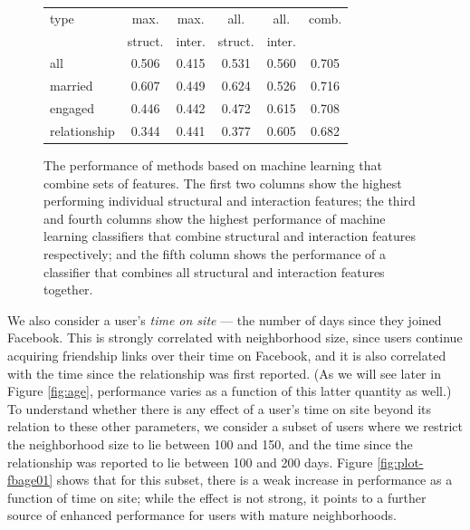 \documentclass{sigchi}
\def\rs{\vspace*{-0.10in}}
\begin{document}
\begin{figure}
\begin{center}
\begin{tabular}{|l|c|c|c|c|c|}
\hline
type & max. & max. & all. & all. & comb. \\
     & struct. & inter. & struct. & inter. & 
\\\hline
all & 0.506 & 0.415 & 0.531 & 0.560 & 0.705
\\\hline
married & 0.607 & 0.449 & 0.624 & 0.526 & 0.716
\\\hline
engaged & 0.446 & 0.442 & 0.472 & 0.615 & 0.708
\\\hline
relationship & 0.344 & 0.441 & 0.377 & 0.605 & 0.682
\\\hline
\end{tabular}
\caption{
\label{table:ml_perf}
The performance of methods based on machine learning that combine
sets of features.
The first two columns show the highest performing individual structural
and interaction features; the third and fourth columns show the
highest performance of machine learning classifiers that combine
structural and interaction features respectively; and the fifth
column shows the performance of a classifier that combines all
structural and interaction features together.
\rs 
}
\end{center}
\vspace*{-0.12in}
\end{figure}

We also consider a user's {\em time on site} --- the number of days
since they joined Facebook.
This is strongly correlated with neighborhood size, since users
continue acquiring friendship links over their time on Facebook,
and it is also correlated with the time since the relationship 
was first reported. (As we will see later in 
Figure \ref{fig:age}, performance varies as a function of this
latter quantity as well.)
To understand whether there is any effect of a user's time on site
beyond its relation to these other parameters, we consider a subset
of users where we restrict the neighborhood size to lie 
between 100 and 150, and the time since the relationship was reported
to lie between 100 and 200 days.
Figure \ref{fig:plot-fbage01} shows that for this subset, there
is a weak increase in performance as a function of time on site;
while the effect is not strong, 
it points to a further source of enhanced performance
for users with mature neighborhoods.
\end{document}
